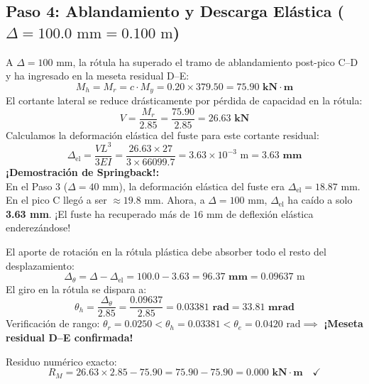 \documentclass[11pt,letterpaper]{article}
\begin{document}
\subsection{Paso 4: Ablandamiento y Descarga Elástica (\texorpdfstring{$\Delta = 100.0\text{ mm} = 0.100\text{ m}$}{Delta = 100.0 mm})}

\begin{examplebox}
A $\Delta = 100\text{ mm}$, la rótula ha superado el tramo de ablandamiento post-pico C--D y ha ingresado en la meseta residual D--E:
\begin{equation}
M_h = M_r = c \cdot M_y = 0.20 \times 379.50 = \mathbf{75.90\text{ kN}\cdot\text{m}}
\end{equation}
El cortante lateral se reduce drásticamente por pérdida de capacidad en la rótula:
\begin{equation}
V = \frac{M_r}{2.85} = \frac{75.90}{2.85} = \mathbf{26.63\text{ kN}}
\end{equation}
Calculamos la deformación elástica del fuste para este cortante residual:
\begin{equation}
\Delta_{\text{el}} = \frac{V L^3}{3 E I} = \frac{26.63 \times 27}{3 \times 66099.7} = 3.63 \times 10^{-3}\text{ m} = \mathbf{3.63\text{ mm}}
\end{equation}
\textbf{¡Demostración de Springback!:}\\
En el Paso 3 ($\Delta = 40\text{ mm}$), la deformación elástica del fuste era $\Delta_{\text{el}} = 18.87\text{ mm}$. En el pico C llegó a ser $\approx 19.8\text{ mm}$. Ahora, a $\Delta = 100\text{ mm}$, $\Delta_{\text{el}}$ ha caído a solo \textbf{3.63 mm}. ¡El fuste ha recuperado más de $16\text{ mm}$ de deflexión elástica enderezándose!

El aporte de rotación en la rótula plástica debe absorber todo el resto del desplazamiento:
\begin{equation}
\Delta_{\theta} = \Delta - \Delta_{\text{el}} = 100.0 - 3.63 = \mathbf{96.37\text{ mm}} = 0.09637\text{ m}
\end{equation}
El giro en la rótula se dispara a:
\begin{equation}
\theta_h = \frac{\Delta_{\theta}}{2.85} = \frac{0.09637}{2.85} = \mathbf{0.03381\text{ rad}} = \mathbf{33.81\text{ mrad}}
\end{equation}
Verificación de rango: $\theta_r = 0.0250 < \theta_h = 0.03381 < \theta_e = 0.0420\text{ rad} \implies$ \textbf{¡Meseta residual D--E confirmada!}

Residuo numérico exacto:
\begin{equation}
R_M = 26.63 \times 2.85 - 75.90 = 75.90 - 75.90 = \mathbf{0.000\text{ kN}\cdot\text{m}} \quad \checkmark
\end{equation}
\end{examplebox}
\end{document}
